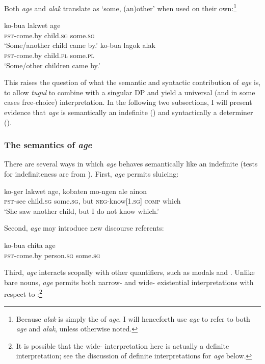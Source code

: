 \documentclass[output=paper,newtxmath,modfonts,nonflat,hidelinks]{langsci/langscibook}
\begin{document}
\noindent Both \textit{age} and \textit{alak} translate as ‘some, (an)other’ when used on their own:\footnote{Because \textit{alak} is simply the  of \textit{age}, I will henceforth use \textit{age} to refer to both \textit{age} and \textit{alak}, unless otherwise noted.}

\ea \label{ex:agealak}  
\ea
\gll ko-bua lakwet age\\
	   \textsc{pst}-come.by child.\textsc{sg} some.\textsc{sg}\\
  \glt ‘Some/another child came by.’
\ex 
\gll ko-bua lagok alak\\
	   \textsc{pst}-come.by child.\textsc{pl} some.\textsc{pl}\\
  \glt ‘Some/other children came by.’
  \z
\z

This raises the question of what the semantic and syntactic contribution of \textit{age} is, to allow \textit{tugul} to combine with a singular DP and yield a universal (and in some cases free-choice) interpretation. In the following two subsections, I will present evidence that \textit{age} is semantically an indefinite () and syntactically a determiner ().

\subsubsection{The semantics of \textit{age}}
\label{sec:landman:agesem}
There are several ways in which \textit{age} behaves semantically like an indefinite (tests for indefiniteness are from \citealt{Matthewson:1999}). First, \textit{age} permits sluicing:

\ea \label{ex:landman:sluicingage}
    \gll ko-ger lakwet age, kobaten mo-ngen ale ainon\\
         \textsc{pst}-see child.\textsc{sg} some.\textsc{sg}, but \textsc{neg}-know[1.\textsc{sg}] \textsc{comp} which\\
    \glt ‘She saw another child, but I do not know which.’
\z

 Second, \textit{age} may introduce new discourse referents:

\ea
  \gll ko-bua chita age\\
       \textsc{pst}-come.by person.\textsc{sg} some.\textsc{sg}\\
\z

\newpage  
 Third, \textit{age} interacts scopally with other quantifiers, such as modals and . Unlike bare nouns, \textit{age} permits both narrow- and wide- existential interpretations with respect to :\footnote{It is possible that the wide- interpretation here is actually a definite interpretation; see the discussion of definite interpretations for \textit{age} below.}
\end{document}

